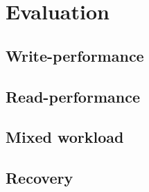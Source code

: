 \chapter{Evaluation}\label{chap:evaluation}

\section{Write-performance}
\section{Read-performance}
\section{Mixed workload}
\section{Recovery}
